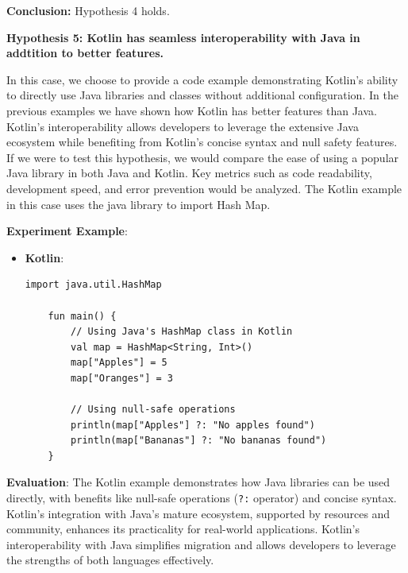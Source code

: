 \noindent \textbf{Conclusion:}  Hypothesis 4 holds. 

\vspace{1em}

\noindent \textbf{Hypothesis 5: Kotlin has seamless interoperability with Java in addtition to better features.}

\vspace{1em}

\noindent In this case, we choose to provide a code example demonstrating Kotlin's ability to directly use Java libraries and classes without additional configuration. In the previous examples we have shown how Kotlin has better features than Java. Kotlin's interoperability allows developers to leverage the extensive Java ecosystem while benefiting from Kotlin's concise syntax and null safety features. If we were to test this hypothesis, we would compare the ease of using a popular Java library in both Java and Kotlin. Key metrics such as code readability, development speed, and error prevention would be analyzed. The Kotlin example in this case uses the java library to import Hash Map.

\vspace{1em}

\noindent \textbf{Experiment Example}:
\begin{tcolorbox}[colframe=blue!80!black, colback=blue!5!white, coltitle=blue!50!black, title={-}]
    \begin{itemize}
        \item \textbf{Kotlin}:
        \begin{lstlisting}[style=kotlin]
    import java.util.HashMap

    fun main() {
        // Using Java's HashMap class in Kotlin
        val map = HashMap<String, Int>()
        map["Apples"] = 5
        map["Oranges"] = 3

        // Using null-safe operations
        println(map["Apples"] ?: "No apples found")
        println(map["Bananas"] ?: "No bananas found")
    }
        \end{lstlisting}

    \end{itemize}
\end{tcolorbox}

\vspace{1em}

\noindent \textbf{Evaluation}: The Kotlin example demonstrates how Java libraries can be used directly, with benefits like null-safe operations (\texttt{?:} operator) and concise syntax. Kotlin's integration with Java's mature ecosystem, supported by resources and community, enhances its practicality for real-world applications.  Kotlin’s interoperability with Java simplifies migration and allows developers to leverage the strengths of both languages effectively.

